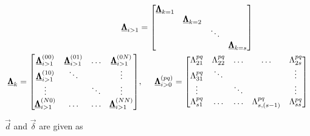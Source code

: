 \begin{equation}
    \begin{split}
        \underline{\pmb{\Lambda}}_{i>1} &= 
        \begin{bmatrix}
            \underline{\pmb{\Lambda}}_{k=1} & & & \\
            & \underline{\pmb{\Lambda}}_{k=2} & & \\
            & & \ddots & \\
            & & & \underline{\pmb{\Lambda}}_{k=s}    
        \end{bmatrix}
        \\
        \underline{\pmb{\Lambda}}_{k} = 
        \begin{bmatrix}
            \underline{\pmb{\Lambda}}_{i>1}^{(00)} & \underline{\pmb{\Lambda}}_{i>1}^{(01)} & \hdots & \underline{\pmb{\Lambda}}_{i>1}^{(0N)} \\
            \underline{\pmb{\Lambda}}_{i>1}^{(10)} & \ddots             &        & \vdots \\
            \vdots             &                    & \ddots & \vdots \\
            \underline{\pmb{\Lambda}}_{i>1}^{(N0)} & \hdots & \hdots  & \underline{\pmb{\Lambda}}_{i>1}^{(NN)}
        \end{bmatrix}&, \hspace{.5cm}
        \underline{\pmb{\Lambda}}_{i>0}^{(pq)} = 
        \begin{bmatrix}
            \Lambda_{21}^{pq} & \Lambda_{22}^{pq} & \hdots & \hdots & \Lambda_{2s}^{pq} \\
            \Lambda_{31}^{pq} & \ddots & & & \vdots \\
            \vdots & & \ddots & & \vdots \\
            \Lambda_{s1}^{pq} & \hdots & \hdots & \Lambda_{s,(s-1)}^{pq} & \Lambda_{ss}^{pq}
        \end{bmatrix}
    \end{split}
\end{equation}

$\Vec{d}$ and $\Vec{\delta}$ are given as

